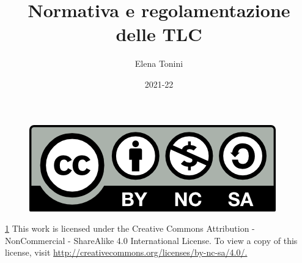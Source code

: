 \documentclass{report}
\title{Normativa e regolamentazione delle TLC}
\author{Elena Tonini}
\date{2021-22}
\begin{document}
    \maketitle
    \newpage

    \begin{figure}
        \centering
        \includegraphics{by-nc-sa.png}
        \label{creativecommons}
    \end{figure}
    \ref{creativecommons} 
    This work is licensed under the Creative Commons Attribution - NonCommercial - ShareAlike 4.0 International License. To view a copy of this license, visit\newline
    \href{http://creativecommons.org/licenses/by-nc-sa/4.0/.
    }{http://creativecommons.org/licenses/by-nc-sa/4.0/.
    }

    \tableofcontents

    
    
    
    
    
    
    
    
    
\end{document}
